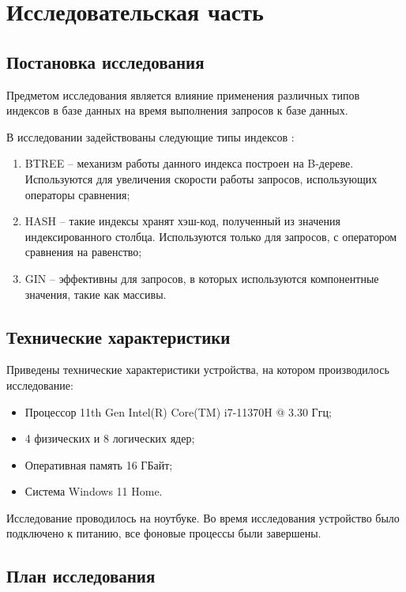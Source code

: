 \chapter{Исследовательская часть}

\section{Постановка исследования}

Предметом исследования является влияние применения различных типов индексов в базе данных на время выполнения запросов к базе данных.

В исследовании задействованы следующие типы индексов \cite{pg-indexes}:

\begin{enumerate}
	\item BTREE -- механизм работы данного индекса построен на B-дереве. Используются для увеличения скорости работы запросов, использующих операторы сравнения;
	\item HASH -- такие индексы хранят хэш-код, полученный из значения индексированного столбца. Используются только для запросов, с оператором сравнения на равенство;
	\item GIN -- эффективны для запросов, в которых используются компонентные значения, такие как массивы.
\end{enumerate}

\section{Технические характеристики}

Приведены технические характеристики устройства, на котором производилось исследование:

\begin{itemize}[label=—]
	\item Процессор 11th Gen Intel(R) Core(TM) i7-11370H @ 3.30 Ггц;
	\item 4 физических и 8 логических ядер;
	\item Оперативная память 16 ГБайт;
	\item Система Windows 11 Home.
\end{itemize}

Исследование проводилось на ноутбуке. Во время исследования устройство было подключено к питанию,
все фоновые процессы были завершены.

\section{План исследования}

